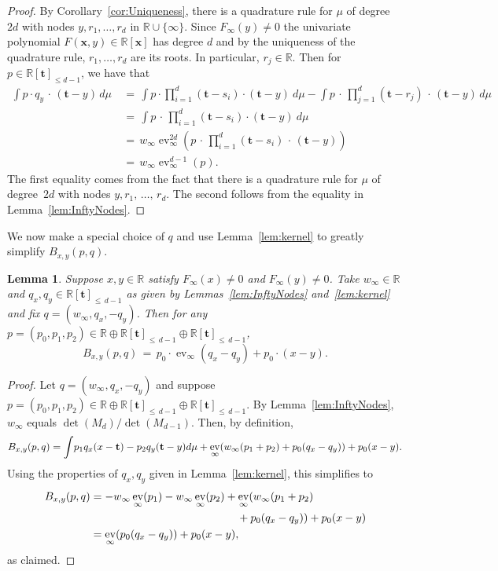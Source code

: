 \documentclass[11pt]{article}
\newtheorem{lemm}[theo]{Lemma}
\theoremstyle{definition}
\numberwithin{equation}{section}
\numberwithin{figure}{section}
\numberwithin{table}{section}
\DeclareMathOperator\ev{ev}
\newcommand\R{\mathbb R}
\renewcommand\t{\mathbf{t}}
\newcommand\x{\mathbf{x}}
\begin{document}
\begin{proof}
By Corollary~\ref{cor:Uniqueness}, there is a quadrature rule for $\mu$ of degree~$2d$ with nodes $y, r_1,\hdots, r_d$ in $\R\cup \{\infty\}$. Since $F_{\infty}(y)\neq 0$ the univariate polynomial $F(\x,y)\in\R[\x]$ has degree $d$ and by the uniqueness of the quadrature rule, $r_1,\hdots, r_d$ are its roots. In particular, $r_j\in \R$. Then for $p\in \R[\t]_{\leq d-1}$, we have that
\begin{align*}
\int p \cdot q_y\,\cdot\,(\t-y) \, d\mu
\ &= \, \int p \cdot \prod_{i=1}^{d}(\t-s_i) \cdot (\t-y) \ d\mu - \int p\,\cdot\, \prod_{j=1}^d(\t-r_j)\,\cdot\,(\t-y) \, d\mu\\
&= \, \int p\,\cdot\,\prod_{i=1}^{d}(\t-s_i) \cdot (\t-y) \ d\mu\\
&= \, w_{\infty}\ev^{2d}_{\infty}\left(p \,\cdot\,\prod_{i=1}^{d}(\t-s_i)\,\cdot\,(\t-y)\right)\\
&= \, w_{\infty}\ev^{d-1}_{\infty}(p).
\end{align*}
The first equality comes from the fact that there is a quadrature rule for $\mu$ of degree~$2d$ with nodes $y,r_1,\,\hdots,\,r_d$. The second follows from the equality in Lemma~\ref{lem:InftyNodes}.
\end{proof}

We now make a special choice of $q$ and use Lemma~\ref{lem:kernel} to greatly simplify $B_{x,y}(p,q)$.

\begin{lemm}\label{lem:q}
Suppose $x,y\in \R$ satisfy $F_{\infty}(x)\neq0$ and $F_{\infty}(y)\neq0$. Take $w_\infty\in \R$ and $q_x, q_y\in \R[\t]_{\leq \,d-1}$ as given by Lemmas~\ref{lem:InftyNodes} and~\ref{lem:kernel} and fix $q = (w_{\infty}, q_x, -q_y)$. Then for any $p = (p_0, p_1, p_2)\in \R\oplus \R[\t]_{\leq\,d-1}\oplus \R[\t]_{\leq\,d-1}$,
\[
B_{x,y}(p,q) \, = \, p_0\cdot \ev_{\infty}(q_x-q_y) +p_0 \cdot (x-y).
\]
\end{lemm}


\begin{proof}
Let $q = (w_{\infty}, q_x, -q_y)$ and suppose $p = (p_0,p_1, p_2) \in \R \oplus \R[\t]_{\leq\,d-1} \oplus \R[\t]_{\leq\,d-1}$. By Lemma~\ref{lem:InftyNodes}, $w_{\infty} $ equals $\det(M_d)/\det(M_{d-1})$. Then, by definition,
\[
B_{x,y}(p,q) =\int \! p_1q_x (x-\t) - p_2q_y (\t-y) d\mu + \ev_{\infty}(w_{\infty}(p_1+p_2)+p_0(q_x-q_y)) +p_0(x-y).\\
\]
Using the properties of $q_x, q_y$ given in Lemma~\ref{lem:kernel}, this simplifies to
\begin{align*}
B_{x,y}(p,q)& = -w_{\infty}\ev_{\infty}(p_1) -w_{\infty} \ev_{\infty}(p_2) +\ev_{\infty}(w_{\infty}(p_1+p_2)\\
& \mkern 240mu +p_0(q_x-q_y)) +p_0(x-y)\\
& = \ev_{\infty}(p_0(q_x-q_y)) +p_0(x-y),
\end{align*}
as claimed.
\end{proof}
\end{document}
